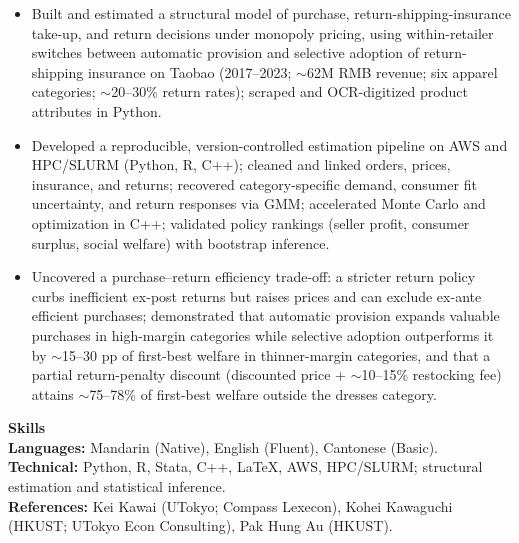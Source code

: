 \documentclass[11pt,letterpaper]{article}
\begin{document}
\begin{itemize}
  \item Built and estimated a structural model of purchase, return-shipping-insurance take-up, and return decisions under monopoly pricing, using within-retailer switches between automatic provision and selective adoption of return-shipping insurance on Taobao (2017--2023; \(\sim\)62M RMB revenue; six apparel categories; \(\sim\)20--30\% return rates); scraped and OCR-digitized product attributes in Python.
  \item Developed a reproducible, version-controlled estimation pipeline on AWS and HPC/SLURM (Python, R, C++); cleaned and linked orders, prices, insurance, and returns; recovered category-specific demand, consumer fit uncertainty, and return responses via GMM; accelerated Monte Carlo and optimization in C++; validated policy rankings (seller profit, consumer surplus, social welfare) with bootstrap inference.
  \item Uncovered a purchase--return efficiency trade-off: a stricter return policy curbs inefficient ex-post returns but raises prices and can exclude ex-ante efficient purchases; demonstrated that automatic provision expands valuable purchases in high-margin categories while selective adoption outperforms it by \(\sim\)15--30 pp of first-best welfare in thinner-margin categories, and that a partial return-penalty discount (discounted price + \(\sim\)10--15\% restocking fee) attains \(\sim\)75--78\% of first-best welfare outside the dresses category.
\end{itemize}

\vspace{16pt}

{\large \textbf{Skills}}\\[-0.5pt]
\textbf{Languages:} Mandarin (Native), English (Fluent), Cantonese (Basic).\\
\textbf{Technical:} Python, R, Stata, C++, \LaTeX, AWS, HPC/SLURM; structural estimation and statistical inference.\\
\textbf{References:} Kei Kawai (UTokyo; Compass Lexecon), Kohei Kawaguchi (HKUST; UTokyo Econ Consulting), Pak Hung Au (HKUST).
\end{document}
